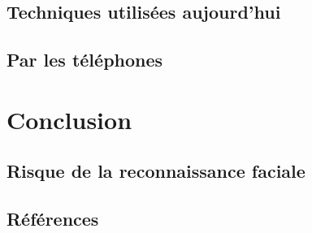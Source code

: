 \documentclass{beamer}
\theoremstyle{plain}
\theoremstyle{definition}
\begin{document}
\subsection{Techniques utilisées aujourd'hui}
\subsection{Par les téléphones}

\section{Conclusion}
\subsection{Risque de la reconnaissance faciale}
\subsection{Références}

\begin{frame}  
\end{frame}
\end{document}
